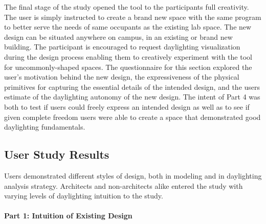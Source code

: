 The final stage of the study opened the tool to the participants full
creativity.  The user is simply instructed to create a brand new space
with the same program to better serve the needs of same occupants as
the existing lab space.  The new design can be situated anywhere on
campus, in an existing or brand new building.  The participant is
encouraged to request daylighting visualization during the design
process enabling them to creatively experiment with the tool for
uncommonly-shaped spaces.
%
The questionnaire for this section explored the user's motivation
behind the new design, the expressiveness of the physical primitives
for capturing the essential details of the intended design, and the
users estimate of the daylighting autonomy of the new design.  The
intent of Part 4 was both to test if users could freely express an
intended design as well as to see if given complete freedom users were
able to create a space that demonstrated good daylighting
fundamentals.



\subsection{User Study Results}

Users demonstrated different styles of design, both in modeling and in
daylighting analysis strategy.  Architects and non-architects alike
entered the study with varying levels of daylighting intuition to the
study.

\paragraph{Part 1: Intuition of Existing Design}

